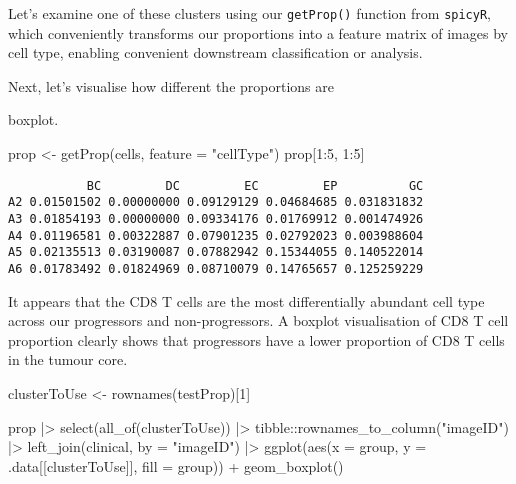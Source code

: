 \documentclass[
  letterpaper,
  DIV=11,
  numbers=noendperiod]{scrreprt}
\newenvironment{Shaded}{\begin{snugshade}}{\end{snugshade}}
\newcommand{\AttributeTok}[1]{\textcolor[rgb]{0.40,0.45,0.13}{#1}}
\newcommand{\DecValTok}[1]{\textcolor[rgb]{0.68,0.00,0.00}{#1}}
\newcommand{\FunctionTok}[1]{\textcolor[rgb]{0.28,0.35,0.67}{#1}}
\newcommand{\NormalTok}[1]{\textcolor[rgb]{0.00,0.23,0.31}{#1}}
\newcommand{\OtherTok}[1]{\textcolor[rgb]{0.00,0.23,0.31}{#1}}
\newcommand{\SpecialCharTok}[1]{\textcolor[rgb]{0.37,0.37,0.37}{#1}}
\newcommand{\StringTok}[1]{\textcolor[rgb]{0.13,0.47,0.30}{#1}}
\begin{document}
Let's examine one of these clusters using our \texttt{getProp()}
function from \texttt{spicyR}, which conveniently transforms our
proportions into a feature matrix of images by cell type, enabling
convenient downstream classification or analysis.

Next, let's visualise how different the proportions are

boxplot.

\begin{Shaded}
\begin{Highlighting}[]
\NormalTok{prop }\OtherTok{\textless{}{-}} \FunctionTok{getProp}\NormalTok{(cells, }\AttributeTok{feature =} \StringTok{"cellType"}\NormalTok{)}
\NormalTok{prop[}\DecValTok{1}\SpecialCharTok{:}\DecValTok{5}\NormalTok{, }\DecValTok{1}\SpecialCharTok{:}\DecValTok{5}\NormalTok{]}
\end{Highlighting}
\end{Shaded}

\begin{verbatim}
           BC         DC         EC         EP          GC
A2 0.01501502 0.00000000 0.09129129 0.04684685 0.031831832
A3 0.01854193 0.00000000 0.09334176 0.01769912 0.001474926
A4 0.01196581 0.00322887 0.07901235 0.02792023 0.003988604
A5 0.02135513 0.03190087 0.07882942 0.15344055 0.140522014
A6 0.01783492 0.01824969 0.08710079 0.14765657 0.125259229
\end{verbatim}

It appears that the CD8 T cells are the most differentially abundant
cell type across our progressors and non-progressors. A boxplot
visualisation of CD8 T cell proportion clearly shows that progressors
have a lower proportion of CD8 T cells in the tumour core.

\begin{Shaded}
\begin{Highlighting}[]
\NormalTok{clusterToUse }\OtherTok{\textless{}{-}} \FunctionTok{rownames}\NormalTok{(testProp)[}\DecValTok{1}\NormalTok{]}

\NormalTok{prop }\SpecialCharTok{|\textgreater{}}
  \FunctionTok{select}\NormalTok{(}\FunctionTok{all\_of}\NormalTok{(clusterToUse)) }\SpecialCharTok{|\textgreater{}}
\NormalTok{  tibble}\SpecialCharTok{::}\FunctionTok{rownames\_to\_column}\NormalTok{(}\StringTok{"imageID"}\NormalTok{) }\SpecialCharTok{|\textgreater{}}
  \FunctionTok{left\_join}\NormalTok{(clinical, }\AttributeTok{by =} \StringTok{"imageID"}\NormalTok{) }\SpecialCharTok{|\textgreater{}}
  \FunctionTok{ggplot}\NormalTok{(}\FunctionTok{aes}\NormalTok{(}\AttributeTok{x =}\NormalTok{ group, }\AttributeTok{y =}\NormalTok{ .data[[clusterToUse]], }\AttributeTok{fill =}\NormalTok{ group)) }\SpecialCharTok{+}
  \FunctionTok{geom\_boxplot}\NormalTok{()}
\end{Highlighting}
\end{Shaded}
\end{document}
